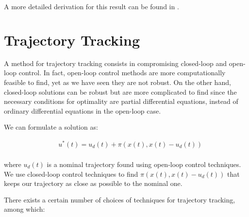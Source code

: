 \documentclass[twoside]{article}
\begin{document}
A more detailed derivation for this result can be found in \cite{lyupanov}.


\section{Trajectory Tracking}
A method for trajectory tracking consists in compromising closed-loop and open-loop control. In fact, open-loop control methods are more computationally feasible to find, yet as we have seen they are not robust. On the other hand, closed-loop solutions can be robust but are more complicated to find since the necessary conditions for optimality are partial differential equations, instead of ordinary differential equations in the open-loop case.

We can formulate a solution as:

\begin{equation} \label{constrained}
\begin{split}
\: \: &u^*(t) = u_d(t) + \pi(x(t), x(t)-u_d(t)) \\
\end{split}
\end{equation}

where $u_d(t)$ is a nominal trajectory found using open-loop control techniques. We use closed-loop control techniques to find $\pi(x(t), x(t)-u_d(t))$ that keeps our trajectory as close as possible to the nominal one.

There exists a certain number of choices of techniques for trajectory tracking, among which:
\end{document}

